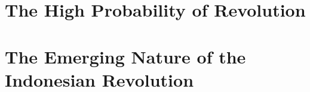 \section{The High Probability of Revolution}

\section{The Emerging Nature of the Indonesian Revolution}